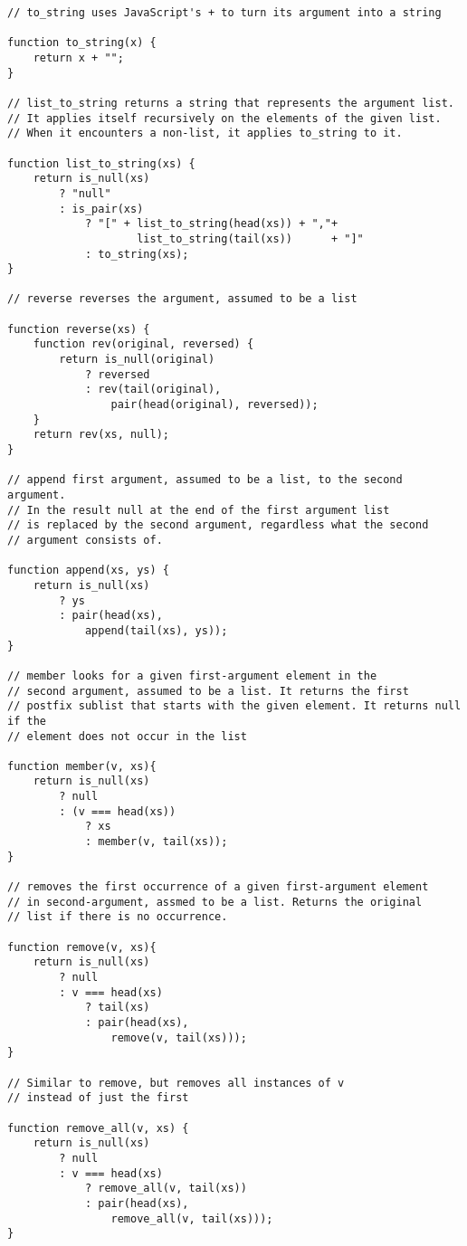 \begin{lstlisting}
// to_string uses JavaScript's + to turn its argument into a string

function to_string(x) {
    return x + "";
}

// list_to_string returns a string that represents the argument list.
// It applies itself recursively on the elements of the given list.
// When it encounters a non-list, it applies to_string to it.

function list_to_string(xs) {
    return is_null(xs)
        ? "null"
        : is_pair(xs)
            ? "[" + list_to_string(head(xs)) + ","+
                    list_to_string(tail(xs))      + "]"
            : to_string(xs);
}

// reverse reverses the argument, assumed to be a list

function reverse(xs) {
    function rev(original, reversed) {
        return is_null(original)
            ? reversed
            : rev(tail(original), 
                pair(head(original), reversed));
    }
    return rev(xs, null);
}

// append first argument, assumed to be a list, to the second argument.
// In the result null at the end of the first argument list
// is replaced by the second argument, regardless what the second
// argument consists of.

function append(xs, ys) {
    return is_null(xs)
        ? ys
        : pair(head(xs),
            append(tail(xs), ys));
} 

// member looks for a given first-argument element in the 
// second argument, assumed to be a list. It returns the first 
// postfix sublist that starts with the given element. It returns null if the 
// element does not occur in the list

function member(v, xs){
    return is_null(xs)
        ? null
        : (v === head(xs))
            ? xs
            : member(v, tail(xs));
}

// removes the first occurrence of a given first-argument element
// in second-argument, assmed to be a list. Returns the original 
// list if there is no occurrence.

function remove(v, xs){
    return is_null(xs)
        ? null
        : v === head(xs)
            ? tail(xs)
            : pair(head(xs), 
                remove(v, tail(xs)));
}

// Similar to remove, but removes all instances of v
// instead of just the first

function remove_all(v, xs) {
    return is_null(xs)
        ? null
        : v === head(xs)
            ? remove_all(v, tail(xs))
            : pair(head(xs), 
                remove_all(v, tail(xs)));
}


\end{lstlisting}
